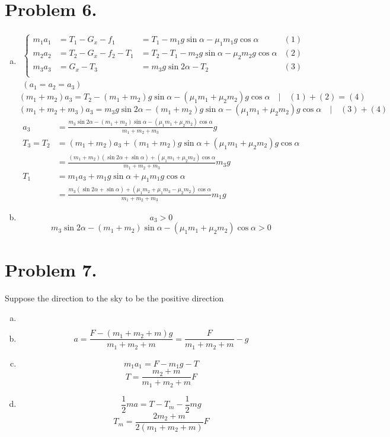 \documentclass{article}
\begin{document}
\section*{Problem 6.}
	\begin{enumerate}[(a)]
	\item
		\begin{eqnarray*}
			\left\{
			\begin{array}{llll}		
				m_1a_1&=T_1-G_x-f_1
				&=T_1-m_1g\sin\alpha-\mu_1m_1g\cos\alpha &(1)\\
				m_2a_2&=T_2-G_x-f_2-T_1
				&=T_2-T_1-m_2g\sin\alpha-\mu_2m_2g\cos\alpha &(2)\\
				m_3a_3&=G_x-T_3
				&=m_3g\sin2\alpha-T_2 &(3)\\
			\end{array}
			\right.\\(a_1=a_2=a_3)
		\end{eqnarray*}
		$$(m_1+m_2)a_3=T_2-(m_1+m_2)g\sin\alpha-(\mu_1m_1+\mu_2m_2)g\cos\alpha\quad|\quad(1)+(2)=(4)$$
		$$(m_1+m_2+m_3)a_3=m_3g\sin2\alpha-(m_1+m_2)g\sin\alpha-(\mu_1m_1+\mu_2m_2)g\cos\alpha\quad|\quad(3)+(4)$$
		\begin{align*}
			a_3&=\frac{m_3\sin2\alpha-(m_1+m_2)\sin\alpha-(\mu_1m_1+\mu_2m_2)\cos\alpha}{m_1+m_2+m_3}g\\
			T_3=T_2&=(m_1+m_2)a_3+(m_1+m_2)g\sin\alpha+(\mu_1m_1+\mu_2m_2)g\cos\alpha\\
			&=\frac{(m_1+m_2)(\sin2\alpha+\sin\alpha)+(\mu_1m_1+\mu_2m_2)\cos\alpha}{m_1+m_2+m_3}m_3g\\
			T_1&=m_1a_3+m_1g\sin\alpha+\mu_1m_1g\cos\alpha\\
			&=\frac{m_3(\sin2\alpha+\sin\alpha)+(\mu_1m_2+\mu_1m_3-\mu_2m_2)\cos\alpha}{m_1+m_2+m_3}m_1g
		\end{align*}
		$$$$
	\item
		$$a_3>0$$
		$$m_3\sin2\alpha-(m_1+m_2)\sin\alpha-(\mu_1m_1+\mu_2m_2)\cos\alpha>0$$
	\end{enumerate}

\section*{Problem 7.}
	Suppose the direction to the sky to be the positive direction
	\begin{enumerate}[(a)]
	\item
	$$$$
	$$$$
	$$$$
	$$$$
	$$$$
	$$$$
	$$$$
	$$$$
	$$$$
	\item
	$$a=\frac{F-(m_1+m_2+m)g}{m_1+m_2+m}=\frac{F}{m_1+m_2+m}-g$$
	\item
	$$m_1a_1=F-m_1g-T$$
	$$T=\frac{m_2+m}{m_1+m_2+m}F$$
	\item
	$$\frac{1}{2}ma=T-T_m-\frac{1}{2}mg$$
	$$T_m=\frac{2m_2+m}{2(m_1+m_2+m)}F$$
	\end{enumerate}
\end{document}
